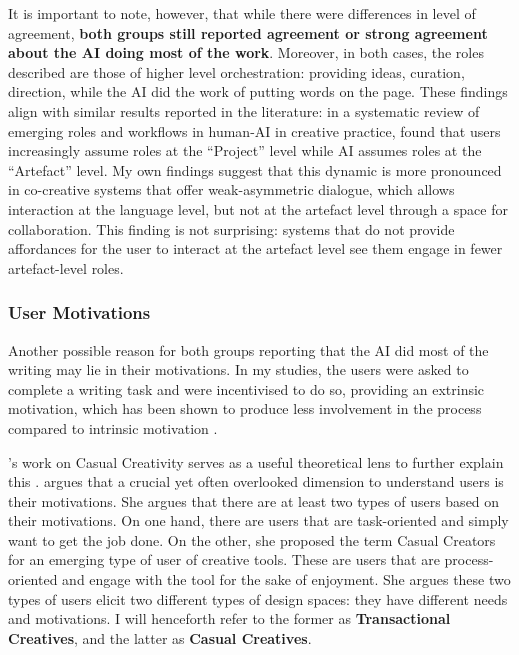 It is important to note, however, that while there were differences in level of agreement, \textbf{both groups still reported agreement or strong agreement about the AI doing most of the work}. Moreover, in both cases, the roles described are those of higher level orchestration: providing ideas, curation, direction, while the AI did the work of putting words on the page. These findings align with similar results reported in the literature: in a systematic review of emerging roles and workflows in human-AI in creative practice, \citet{Palani2024-on} found that users increasingly assume roles at the ``Project'' level while AI assumes roles at the ``Artefact'' level. My own findings suggest that this dynamic is more pronounced in co-creative systems that offer weak-asymmetric dialogue, which allows interaction at the language level, but not at the artefact level through a space for collaboration. This finding is not surprising: systems that do not provide affordances for the user to interact at the artefact level see them engage in fewer artefact-level roles. 

\subsubsection{User Motivations}

Another possible reason for both groups reporting that the AI did most of the writing may lie in their motivations. In my studies, the users were asked to complete a writing task and were incentivised to do so, providing an extrinsic motivation, which has been shown to produce less involvement in the process compared to intrinsic motivation \citep[15]{Amabile1983-lj}. 

\citeauthor{Compton2015-sy}'s work on Casual Creativity serves as a useful theoretical lens to further explain this \citep{Compton2015-sy}. \citeauthor{Compton2015-sy} argues that a crucial yet often overlooked dimension to understand users is their motivations. She argues that there are at least two types of users based on their motivations. On one hand, there are users that are task-oriented and simply want to get the job done. On the other, she proposed the term Casual Creators for an emerging type of user of creative tools. These are users that are process-oriented and engage with the tool for the sake of enjoyment. She argues these two types of users elicit two different types of design spaces: they have different needs and motivations. I will henceforth refer to the former as \textbf{Transactional Creatives}, and the latter as \textbf{Casual Creatives}. 

